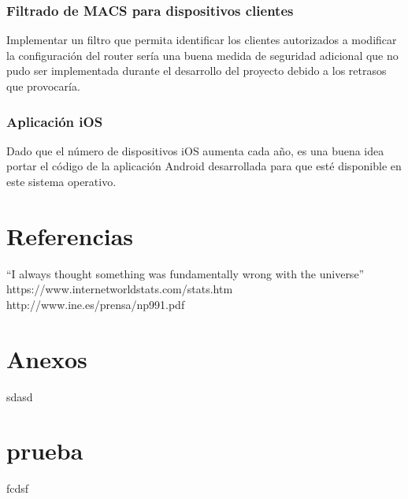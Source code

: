 \documentclass[12pt]{article}
\begin{document}
        \subsubsection{Filtrado de MACS para dispositivos clientes}
        Implementar un filtro que permita identificar los clientes autorizados a modificar la configuración del router sería una buena medida de seguridad adicional que no pudo ser implementada durante el desarrollo del proyecto debido a los retrasos que provocaría.

        \subsubsection{Aplicación iOS}
        Dado que el número de dispositivos iOS aumenta cada año, es una buena idea portar el código de la aplicación Android desarrollada para que esté disponible en este sistema operativo.

\section{Referencias}
``I always thought something was fundamentally wrong with the universe'' \citep{adams1995hitchhiker}
https://www.internetworldstats.com/stats.htm \citep{hola}
http://www.ine.es/prensa/np991.pdf \citep{Menores que utilizan internet}











\appendix
\section{Anexos}
sdasd


\section{prueba}
fcdsf




\end{document}

